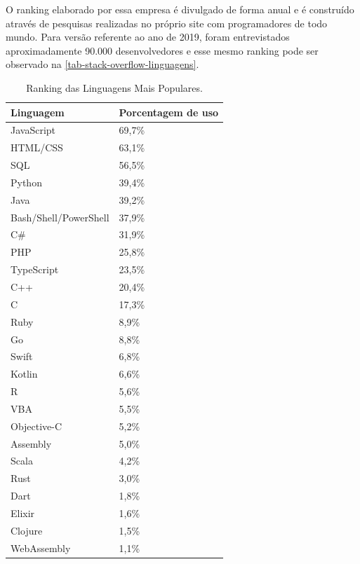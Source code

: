O ranking elaborado por essa empresa é divulgado de forma anual e é construído através de pesquisas realizadas no próprio site com programadores de todo mundo. Para versão referente ao ano de 2019, foram entrevistados aproximadamente 90.000 desenvolvedores e esse mesmo ranking pode ser observado na \autoref{tab-stack-overflow-linguagens}.


\begin{table}[htb]
\ABNTEXfontereduzida
\caption[Ranking das Linguagens Mais Populares]{Ranking das Linguagens Mais Populares.}
\label{tab-stack-overflow-linguagens}
\begin{tabular}{p{5cm}|p{4cm}}
   \textbf{Linguagem} & \textbf{Porcentagem de uso}  \\
    \hline
    JavaScript & 69,7\%  \\
    \hline
    HTML/CSS & 63,1\%  \\
    \hline
    SQL & 56,5\%  \\
    \hline
    Python & 39,4\%  \\
    \hline
    Java & 39,2\%  \\
    \hline
    Bash/Shell/PowerShell & 37,9\%  \\
    \hline
    C\# & 31,9\%  \\
    \hline
    PHP & 25,8\%  \\
    \hline
    TypeScript & 23,5\%  \\
    \hline
    C++ & 20,4\%  \\
    \hline
    C & 17,3\%  \\
    \hline
    Ruby & 8,9\%  \\
    \hline
    Go & 8,8\%  \\
    \hline
    Swift & 6,8\%  \\
    \hline
    Kotlin & 6,6\%  \\
    \hline
    R & 5,6\%  \\
    \hline
    VBA & 5,5\%  \\
    \hline
    Objective-C & 5,2\%  \\
    \hline
    Assembly & 5,0\%  \\
    \hline
    Scala & 4,2\%  \\
    \hline
    Rust & 3,0\%  \\
    \hline
    Dart & 1,8\%  \\
    \hline
    Elixir & 1,6\%  \\
    \hline
    Clojure & 1,5\%  \\
    \hline
    WebAssembly & 1,1\%  \\
\end{tabular}
\end{table}

